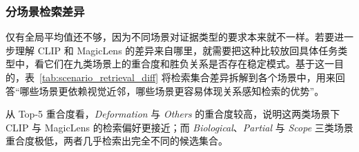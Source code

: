 \subsubsection{分场景检索差异}

仅有全局平均值还不够，因为不同场景对证据类型的要求本来就不一样。若要进一步理解 CLIP 和 MagicLens 的差异来自哪里，就需要把这种比较放回具体任务类型中，看它们在九类场景上的重合度和胜负关系是否存在稳定模式。基于这一目的，表~\ref{tab:scenario_retrieval_diff} 将检索集合差异拆解到各个场景中，用来回答“哪些场景更依赖视觉近邻，哪些场景更容易体现关系感知检索的优势”。

从 Top-5 重合度看，\textit{Deformation} 与 \textit{Others} 的重合度较高，说明这两类场景下 CLIP 与 MagicLens 的检索偏好更接近；而 \textit{Biological}、\textit{Partial} 与 \textit{Scope} 三类场景重合度极低，两者几乎检索出完全不同的候选集合。

